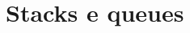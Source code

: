 \documentclass[aspectratio=169,10pt]{beamer}
\begin{document}
%

\section{Stacks e queues}
\end{document}
